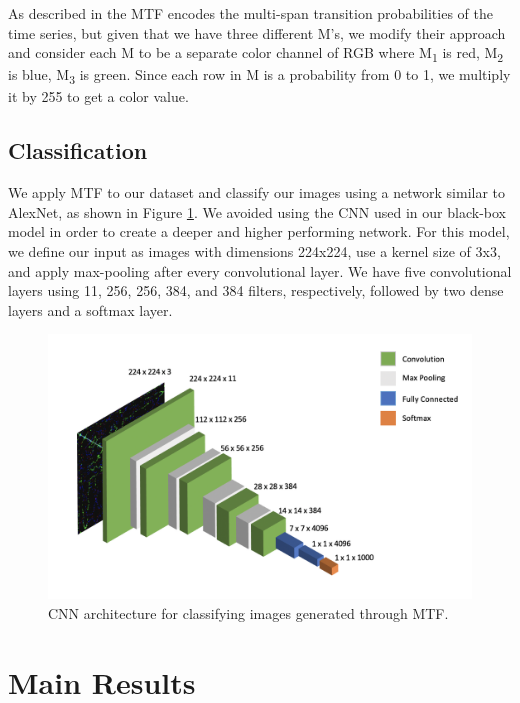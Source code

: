 \documentclass{turabian-thesis}
\begin{document}
As described in \cite{wang_encoding_nodate} the MTF encodes the multi-span transition probabilities of the time series, but given that we have three different M's, we modify their approach and consider each M to be a separate color channel of RGB where M\textsubscript{1} is red, M\textsubscript{2} is blue, M\textsubscript{3} is green. Since each row in M is a probability from 0 to 1, we multiply it by 255 to get a color value.





\section{Classification}
We apply MTF to our dataset and classify our images using a network similar to AlexNet, as shown in Figure \ref{fig:mtf_cnn_model}. We avoided using the CNN used in our black-box model in order to create a deeper and higher performing network. For this model, we define our input as images with dimensions 224x224, use a kernel size of 3x3, and apply max-pooling after every convolutional layer. We have five convolutional layers using 11, 256, 256, 384, and 384 filters, respectively, followed by two dense layers and a softmax layer.
\begin{figure}[h!]
   \begin{center}
      \includegraphics[scale=.7]{../media/2d_cnn.png}
   \end{center}
   \caption{CNN architecture for classifying images generated through MTF.}
   \label{fig:mtf_cnn_model}
\end{figure}



\chapter{Main Results}
\label{chap:results}
\end{document}
